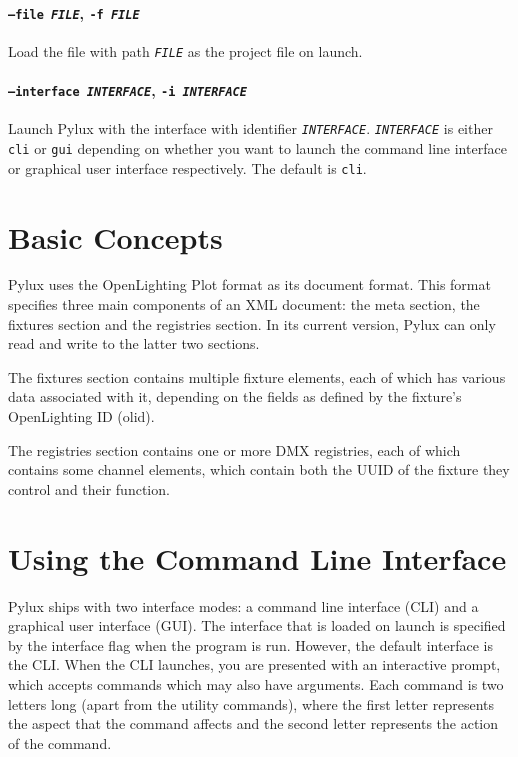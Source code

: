 \documentclass[a4paper]{article}
\begin{document}
\paragraph{\texttt{--file \textit{FILE}}, \texttt{-f \textit{FILE}}} 
Load the file with path \texttt{\textit{FILE}} as the project file on launch.

\paragraph{\texttt{--interface \textit{INTERFACE}}, \texttt{-i 
\textit{INTERFACE}}}
Launch Pylux with the interface with identifier \texttt{\textit{INTERFACE}}.
\texttt{\textit{INTERFACE}} is either \texttt{cli} or \texttt{gui} depending on 
whether you want to launch the command line interface or graphical user 
interface respectively. The default is \texttt{cli}.

\section{Basic Concepts}
Pylux uses the OpenLighting Plot format as its document format. This format 
specifies three main components of an XML document: the meta section, the 
fixtures section and the registries section. In its current version, Pylux 
can only read and write to the latter two sections.

The fixtures section contains multiple fixture elements, each of which has 
various data associated with it, depending on the fields as defined by the 
fixture's OpenLighting ID (olid).

The registries section contains one or more DMX registries, each of which 
contains some channel elements, which contain both the UUID of the fixture 
they control and their function.

\section{Using the Command Line Interface}
Pylux ships with two interface modes: a command line interface (CLI) and a 
graphical user interface (GUI). The interface that is loaded on launch is 
specified by the interface flag when the program is run. However, the 
default interface is the CLI. When the CLI launches, you are presented with an 
interactive prompt, which accepts commands which may also have arguments. Each 
command is two letters long (apart from the utility commands), where the first 
letter represents the aspect that the command affects and the second letter 
represents the action of the command.
\end{document}

